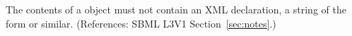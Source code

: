 The contents of a \Notes object must not contain an XML declaration, \ie
a string of the form  or
similar.  (References: SBML L3V1 Section~\ref{sec:notes}.)
